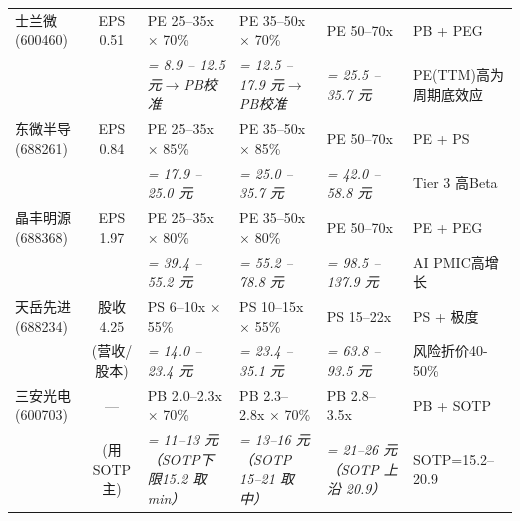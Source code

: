 \begin{exhibitbox}
\begin{tabularx}{\textwidth}{>{\hsize=0.85\hsize}X c >{\hsize=1.1\hsize}X >{\hsize=1.15\hsize}X >{\hsize=1.15\hsize}X >{\hsize=1.0\hsize}X}
\midrule
\rowcolor{riskamber!5}
\centering 士兰微 \newline \scriptsize(600460) & EPS 0.51 & PE 25–35x $\times$ 70\% & PE 35–50x $\times$ 70\% & PE 50–70x & PB + PEG \\
& & \textit{= 8.9 – 12.5 元$\to$PB校准} & \textit{= 12.5 – 17.9 元$\to$PB校准} & \textit{= 25.5 – 35.7 元} & PE(TTM)高为周期底效应 \\
\midrule
\rowcolor{riskamber!5}
\centering 东微半导 \newline \scriptsize(688261) & EPS 0.84 & PE 25–35x $\times$ 85\% & PE 35–50x $\times$ 85\% & PE 50–70x & PE + PS \\
& & \textit{= 17.9 – 25.0 元} & \textit{= 25.0 – 35.7 元} & \textit{= 42.0 – 58.8 元} & Tier 3 高Beta \\
\midrule
\rowcolor{riskamber!5}
\centering 晶丰明源 \newline \scriptsize(688368) & EPS 1.97 & PE 25–35x $\times$ 80\% & PE 35–50x $\times$ 80\% & PE 50–70x & PE + PEG \\
& & \textit{= 39.4 – 55.2 元} & \textit{= 55.2 – 78.8 元} & \textit{= 98.5 – 137.9 元} & AI PMIC高增长 \\
\midrule
\rowcolor{riskred!5}
\centering 天岳先进 \newline \scriptsize(688234) & 股收 4.25 & PS 6–10x $\times$ 55\% & PS 10–15x $\times$ 55\% & PS 15–22x & PS + 极度 \\
& (营收/股本) & \textit{= 14.0 – 23.4 元} & \textit{= 23.4 – 35.1 元} & \textit{= 63.8 – 93.5 元} & 风险折价40-50\% \\
\midrule
\rowcolor{steelgrey!10}
\centering 三安光电 \newline \scriptsize(600703) & — & PB 2.0–2.3x $\times$ 70\% & PB 2.3–2.8x $\times$ 70\% & PB 2.8–3.5x & PB + SOTP \\
& (用SOTP主) & \textit{= 11–13 元（SOTP下限15.2 取 min）} & \textit{= 13–16 元（SOTP 15–21 取中）} & \textit{= 21–26 元（SOTP 上沿 20.9）} & SOTP=15.2–20.9 \\
\bottomrule
\end{tabularx}
\vspace{0.15cm}
\end{exhibitbox}

